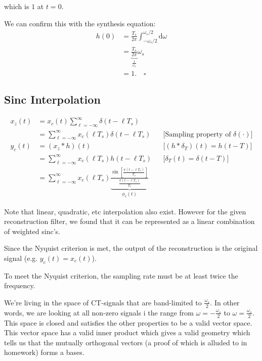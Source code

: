 which is $1$ at $t=0$.

We can confirm this with the synthesis equation:
\begin{align*}
    h(0) 
    &= \frac{T_s}{2\pi}\int_{-\omega_s/2}^{\omega_s/2}  \mathrm d \omega
    \\
    &= \underbrace{\frac{T_s}{2\pi}}_{\frac1{\omega_s}} \omega_s
    \\
    &= 1.\quad\square
\end{align*}

\hrulefill

\subsection{Sinc Interpolation}
\begin{align*}
    x_z(t) 
    &= x_c(t) \sum_{\ell=-\infty}^\infty \delta(t-\ell T_s)
    \\
    &=\sum_{\ell=-\infty}^\infty x_c(\ell T_s) \delta(t-\ell T_s)
    &&\text{[Sampling property of $\delta(\cdot)$]}
    \\
    y_c(t) 
    &= (x_z \ast h)(t)
    &&\text{[$(h\ast \delta_T)(t)=h(t-T)$]}
    \\
    &=\sum_{\ell=-\infty}^\infty x_c(\ell T_s) h(t-\ell T_s)
    &&\text{[$\delta_T(t)=\delta(t-T)$]}
    \\
    &=\sum_{\ell=-\infty}^\infty x_c(\ell T_s) 
    \underbrace{\frac{\sin\left[\frac{\pi(t-\ell T_s)}{T_s}\right]}{\frac{\pi(t-\ell T_s)}{T_s}}}_{\phi_\ell(t)}
\end{align*}

Note that linear, quadratic, etc interpolation also exist. However for the given reconstruction filter, we found that it can be represented as a linear combination of weighted sinc's.

Since the Nyquist criterion is met, the output of the reconstruction is the original signal (e.g. $y_c(t)=x_c(t)$).

To meet the Nyquist criterion, the sampling rate must be at least twice the frequency.

We're living in the space of CT-signals that are band-limited to $\frac{\omega_s}2$. In other words, we are looking at all non-zero signals i the range from $\omega=-\frac{\omega_s}{2}$ to $\omega=\frac{\omega_s}{2}$. This space is closed and satisfies the other properties to be a valid vector space. This vector space has a valid inner product which gives a valid geometry which tells us that the mutually orthogonal vectors (a proof of which is alluded to in homework) forms a bases.

